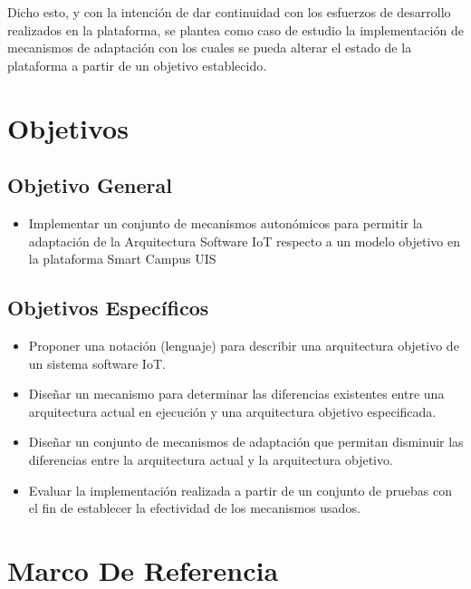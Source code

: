 \documentclass[12pt]{article}
\begin{document}
    Dicho esto, y con la intención de dar continuidad con los esfuerzos de desarrollo realizados en la plataforma, se plantea como caso de estudio la implementación de mecanismos de adaptación con los cuales se pueda alterar el estado de la plataforma a partir de un objetivo establecido.  


    \section{Objetivos}
    \subsection{Objetivo General}
    \begin{itemize}

        \item Implementar un conjunto de mecanismos autonómicos para permitir la adaptación de la Arquitectura Software IoT respecto a un modelo objetivo en la plataforma Smart Campus UIS

    \end{itemize}

    \subsection{Objetivos Específicos}

    \begin{itemize}
        \item Proponer una notación (lenguaje) para describir una arquitectura objetivo de un sistema software IoT.
        \item Diseñar un mecanismo para determinar las diferencias existentes entre una arquitectura actual en ejecución y una arquitectura objetivo especificada.
        \item Diseñar un conjunto de mecanismos de adaptación que permitan disminuir las diferencias entre la arquitectura actual y la arquitectura objetivo.
        \item Evaluar la implementación realizada a partir de un conjunto de pruebas con el fin de establecer la efectividad de los mecanismos usados.

    \end{itemize}


    \section{Marco De Referencia}
\end{document}
